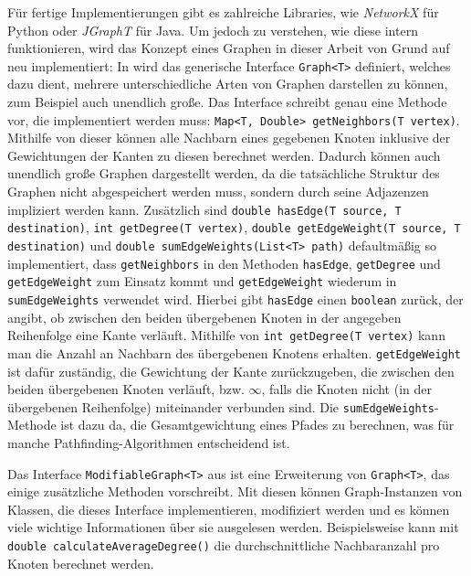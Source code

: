             Für fertige Implementierungen gibt es zahlreiche Libraries, wie \zb \emph{NetworkX} für Python oder \emph{JGraphT} für Java. Um jedoch zu verstehen, wie diese intern funktionieren, wird das Konzept eines Graphen in dieser Arbeit von Grund auf neu implementiert: In  wird das generische Interface \lstinline{Graph<T>} definiert, welches dazu dient, mehrere unterschiedliche Arten von Graphen darstellen zu können, zum Beispiel auch unendlich große. Das Interface schreibt genau eine Methode vor, die implementiert werden muss: \lstinline{Map<T, Double> getNeighbors(T vertex)}. Mithilfe von dieser können alle Nachbarn eines gegebenen Knoten inklusive der Gewichtungen der Kanten zu diesen berechnet werden. Dadurch können auch unendlich große Graphen dargestellt werden, da die tatsächliche Struktur des Graphen nicht abgespeichert werden muss, sondern durch seine Adjazenzen impliziert werden kann. Zusätzlich sind \lstinline{double hasEdge(T source, T destination)}, \lstinline{int getDegree(T vertex)}, \lstinline{double getEdgeWeight(T source, T destination)} und \lstinline{double sumEdgeWeights(List<T> path)} defaultmäßig so implementiert, dass \lstinline{getNeighbors} in den Methoden \lstinline{hasEdge}, \lstinline{getDegree} und \lstinline{getEdgeWeight} zum Einsatz kommt und \lstinline{getEdgeWeight} wiederum in \lstinline{sumEdgeWeights} verwendet wird. Hierbei gibt \lstinline{hasEdge} einen \lstinline{boolean} zurück, der angibt, ob zwischen den beiden übergebenen Knoten in der angegeben Reihenfolge eine Kante verläuft. Mithilfe von \lstinline{int getDegree(T vertex)} kann man die Anzahl an Nachbarn des übergebenen Knotens erhalten. \lstinline{getEdgeWeight} ist dafür zuständig, die Gewichtung der Kante zurückzugeben, die zwischen den beiden übergebenen Knoten verläuft, bzw. $\infty$, falls die Knoten nicht (in der übergebenen Reihenfolge) miteinander verbunden sind. Die \lstinline{sumEdgeWeights}-Methode ist dazu da, die Gesamtgewichtung eines Pfades zu berechnen, was für manche Pathfinding-Algorithmen entscheidend ist.

            

            Das Interface \lstinline{ModifiableGraph<T>} aus  ist eine Erweiterung von \lstinline{Graph<T>}, das einige zusätzliche Methoden vorschreibt. Mit diesen können Graph-Instanzen von Klassen, die dieses Interface implementieren, modifiziert werden und es können viele wichtige Informationen über sie ausgelesen werden. Beispielsweise kann mit \lstinline{double calculateAverageDegree()} die durchschnittliche Nachbaranzahl pro Knoten berechnet werden.

